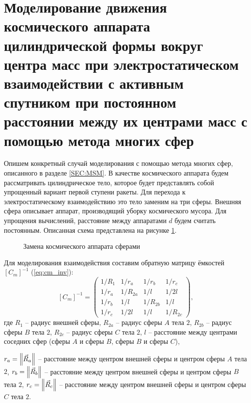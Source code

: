 \section{Моделирование движения космического аппарата цилиндрической формы вокруг центра масс при электростатическом взаимодействии с активным спутником при постоянном расстоянии между их центрами масс с помощью метода многих сфер}
\label{SEC:3SPH}

Опишем конкретный случай моделирования с помощью метода многих сфер, описанного в разделе \ref{SEC:MSM}.
В качестве космического аппарата будем рассматривать цилиндрическое тело, которое будет представлять собой упрощенный вариант первой ступени ракеты.
Для перехода к электростатическому взаимодействию это тело заменим на три сферы.
Внешняя сфера описывает аппарат, производящий уборку космического мусора.
Для упрощения вычислений, расстояние между аппаратами $d$ будем считать постоянным.
Описанная схема представлена на рисунке \ref{ris:3sph}.

\begin{figure}[H]
	\caption{Замена космического аппарата сферами}
	\label{ris:3sph}
\end{figure}

Для моделирования взаимодействия составим обратную матрицу ёмкостей $[C_m]^{-1}$ (\ref{eq:cm_inv}):
\begin{equation}
\label{eq:3sph_cm}
	[C_m]^{-1} = 
	\begin{pmatrix}
		1/R_1	&	1/r_a	&	1/r_b	&	1/r_c\\
		1/r_a	&	1/R_{2a}	&	1/l		&	1/2l\\
		1/r_b	&	1/l		&	1/R_{2b}	&	1/l\\
		1/r_c	&	1/2l		&	1/l		&	1/R_{2c}
	\end{pmatrix},
\end{equation}
где $R_1$ – радиус внешней сферы, $R_{2a}$ – радиус сферы $A$ тела $2$, $R_{2b}$ – радиус сферы $B$ тела $2$, $R_{2c}$ – радиус сферы $C$ тела $2$, $l$ – расстояние между центрами соседних сфер (сферы $A$ и сферы $B$, сферы $B$ и сферы $C$),

\noindent $r_a = \left\lVert\vec{R}_a\right\rVert$ – расстояние между центром внешней сферы и центром сферы $A$ тела $2$, $r_b = \left\lVert\vec{R}_b\right\rVert$ – расстояние между центром внешней сферы и центром сферы $B$ тела $2$, $r_c = \left\lVert\vec{R}_c\right\rVert$ – расстояние между центром внешней сферы и центром сферы $C$ тела $2$.

